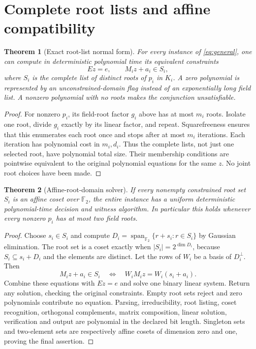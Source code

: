\documentclass[11pt]{article}
\newtheorem{theorem}{Theorem}
\newcommand{\F}{\mathbb F}
\begin{document}
\section{Complete root lists and affine compatibility}
\begin{theorem}[Exact root-list normal form]\label{thm:lists}
For every instance of \eqref{eq:general}, one can compute in deterministic
polynomial time its equivalent constraints
\[
 Ez=e,\qquad M_i z+a_i\in S_i,
\]
where $S_i$ is the complete list of distinct roots of $p_i$ in $K_i$.
A zero polynomial is represented by an unconstrained-domain flag instead of
an exponentially long field list. A nonzero polynomial with no roots makes
the conjunction unsatisfiable.
\end{theorem}
\begin{proof}
For nonzero $p_i$, its field-root factor $g_i$ above has at most $m_i$ roots.
Isolate one root, divide $g_i$ exactly by its linear factor, and repeat.
Squarefreeness ensures that this enumerates each root once and stops after
at most $m_i$ iterations. Each iteration has polynomial cost in $m_i,d_i$.
Thus the complete lists, not just one selected root, have polynomial total
size. Their membership conditions are pointwise equivalent to the original
polynomial equations for the same $z$. No joint root choices have been made.
\end{proof}

\begin{theorem}[Affine-root-domain solver]\label{thm:affine}
If every nonempty constrained root set $S_i$ is an affine coset over
$\F_2$, the entire instance has a uniform deterministic polynomial-time
decision and witness algorithm. In particular this holds whenever every
nonzero $p_i$ has at most two field roots.
\end{theorem}
\begin{proof}
Choose $s_i\in S_i$ and compute
$D_i=\operatorname{span}_{\F_2}\{r+s_i:r\in S_i\}$ by Gaussian elimination.
The root set is a coset exactly when $|S_i|=2^{\dim D_i}$, because
$S_i\subseteq s_i+D_i$ and the elements are distinct. Let the rows of $W_i$
be a basis of $D_i^\perp$. Then
\[
 M_i z+a_i\in S_i
 \quad\Longleftrightarrow\quad
 W_iM_i z=W_i(s_i+a_i).
\]
Combine these equations with $Ez=e$ and solve one binary linear system.
Return any solution, checking the original constraints. Empty root sets
reject and zero polynomials contribute no equation. Parsing, irreducibility,
root listing, coset recognition, orthogonal complements, matrix composition,
linear solution, verification and output are polynomial in the declared bit
length. Singleton sets and two-element sets are respectively affine cosets
of dimension zero and one, proving the final assertion.
\end{proof}
\end{document}
